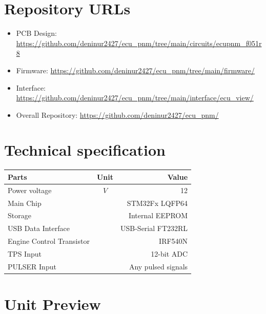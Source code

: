 \documentclass[a4paper,12pt,oneside,pdflatex,italian,final,twocolumn]{article}
\begin{document}
	\raggedright
	
	\section{Repository URLs}
	
	\begin{itemize}
		\item PCB Design: \url{https://github.com/deninur2427/ecu_pnm/tree/main/circuits/ecupnm_f051r8}
		
		\item Firmware: \url{https://github.com/deninur2427/ecu_pnm/tree/main/firmware/}
		
		\item Interface: \url{https://github.com/deninur2427/ecu_pnm/tree/main/interface/ecu_view/}
		
		\item Overall Repository: \url{https://github.com/deninur2427/ecu_pnm/}
	\end{itemize}

	\section{Technical specification}
	\centering
	\begin{tabular}{lcr}
		\toprule
		Parts & Unit & Value \\
		\midrule
		Power voltage & $V$ & 12 \\
		Main Chip & & STM32Fx LQFP64 \\
		Storage & & Internal EEPROM \\
		USB  Data Interface & & USB-Serial FT232RL \\
		Engine Control Transistor & & IRF540N \\
		TPS Input & & 12-bit ADC \\
		PULSER Input & & Any pulsed signals \\
		\bottomrule
	\end{tabular}
	
	\raggedright
	
	\newpage
	\section{Unit Preview}
	
\end{document}
